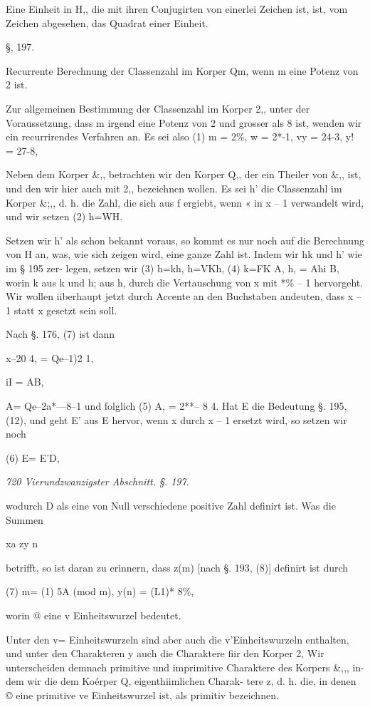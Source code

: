 \documentclass[12pt,a4paper]{article}
\theoremstyle{plain}
\theoremstyle{definition}
\begin{document}

Eine Einheit in H,, die mit ihren Conjugirten von einerlei Zeichen ist, ist, vom Zeichen abgesehen, das Quadrat einer Einheit.

§, 197.

Recurrente Berechnung der Classenzahl im Korper Qm, wenn m eine Potenz von 2 ist.

Zur allgemeinen Bestimmung der Classenzahl im Korper 2,, unter der Voraussetzung, dass m irgend eine Potenz von 2 und grosser als 8 ist, wenden wir ein recurrirendes Verfahren an. Es sei also (1) m = 2\%, w = 2*-1, vy = 24-3, y! = 27-8,

Neben dem Korper \&,, betrachten wir den Korper Q,, der ein Theiler von \&,, ist, und den wir hier auch mit 2,, bezeichnen wollen. Es sei h' die Classenzahl im Korper \&;,, d. h. die Zahl, die sich aus f ergiebt, wenn « in x -- 1 verwandelt wird, und wir setzen (2) h=WH.

Setzen wir h' als schon bekannt voraus, so kommt es nur noch auf die Berechnung von H an, was, wie sich zeigen wird, eine ganze Zahl ist. Indem wir hk und h' wie im § 195 zer- legen, setzen wir (3) h=kh, h=VKh, (4) k=FK A, h, = Ahi B, worin k aus k und h; aus h, durch die Vertauschung von x mit *\% -- 1 hervorgeht. Wir wollen iiberhaupt jetzt durch Accente an den Buchstaben andeuten, dass x -- 1 statt x gesetzt sein soll.

Nach §. 176, (7) ist dann

x--20 4, = Qe--1)2 1,

iI = AB,

A= Qe--2a*---8--1 und folglich (5) A, = 2**-- 8 4. Hat E die Bedeutung §. 195, (12), und geht E' aus E hervor, wenn x durch x -- 1 ersetzt wird, so setzen wir noch

(6) E= E'D,

\vspace{0.5\baselineskip}\noindent\textit{720 Vierundzwanzigster Abschnitt. §. 197.}\par

wodurch D als eine von Null verschiedene positive Zahl definirt ist. Was die Summen

xa zy n

betrifft, so ist daran zu erinnern, dass z(m) [nach §. 193, (8)] definirt ist durch

(7) m= (1) 5A (mod m), y(n) = (L1)* 8\%,

worin @ eine v Einheitswurzel bedeutet.

Unter den v= Einheitswurzeln sind aber auch die v'\texttrademark  Einheitswurzeln enthalten, und unter den Charakteren y auch die Charaktere fiir den Korper 2, Wir unterscheiden demnach primitive und imprimitive Charaktere des Korpers \&,,, in- dem wir die dem Koérper Q, eigenthiimlichen Charak- tere z, d. h. die, in denen © eine primitive ve Einheitswurzel ist, als primitiv bezeichnen.
\end{document}
